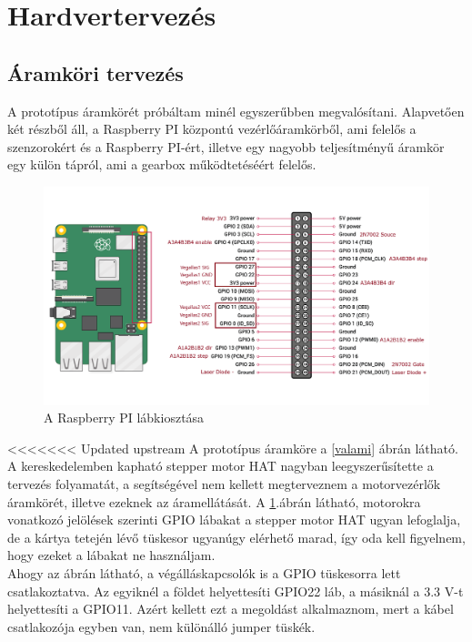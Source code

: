 \documentclass[12pt,a4paper]{article}
\begin{document}
\pagebreak
\section{Hardvertervezés}

\subsection{Áramköri tervezés}
A prototípus áramkörét próbáltam minél egyszerűbben megvalósítani. Alapvetően két részből áll, a Raspberry PI központú vezérlőáramkörből, ami felelős a szenzorokért és a Raspberry PI-ért, illetve egy nagyobb teljesítményű áramkör egy külön tápról, ami a gearbox működtetéséért felelős.


\begin{figure}[h!]
	\centering
	\includegraphics[width=1\linewidth]{elek_pinout}
	\caption{A Raspberry PI lábkiosztása}
	\label{fig:elek_pinout}
\end{figure}

<<<<<<< Updated upstream
A prototípus áramköre a \ref{valami} ábrán látható. A kereskedelemben kapható stepper motor HAT nagyban leegyszerűsítette a tervezés folyamatát, a segítségével nem kellett megterveznem a motorvezérlők áramkörét, illetve ezeknek az áramellátását. A \ref{fig:elek_pinout}.ábrán látható, motorokra vonatkozó jelölések szerinti GPIO lábakat a stepper motor HAT ugyan lefoglalja, de a kártya tetején lévő tüskesor ugyanúgy elérhető marad, így oda kell figyelnem, hogy ezeket a lábakat ne használjam. \\

Ahogy az ábrán látható, a végálláskapcsolók is a GPIO tüskesorra lett csatlakoztatva. Az egyiknél a földet helyettesíti GPIO22 láb, a másiknál a 3.3 V-t helyettesíti a GPIO11. Azért kellett ezt a megoldást alkalmaznom, mert a kábel csatlakozója egyben van, nem különálló jumper tüskék.\\
\end{document}
